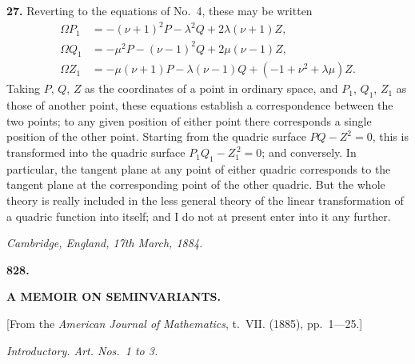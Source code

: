 \documentclass[12pt,a4paper]{article}
\theoremstyle{definition}
\begin{document}
\noindent\textbf{27.} Reverting to the equations of No.~4, these may be written
\begin{align*}
\Omega P_1 &= -(\nu+1)^2 P - \lambda^2 Q + 2\lambda(\nu+1)Z, \\
\Omega Q_1 &= -\mu^2 P - (\nu-1)^2 Q + 2\mu(\nu-1)Z, \\
\Omega Z_1 &= -\mu(\nu+1)P - \lambda(\nu-1)Q + (-1 + \nu^2 + \lambda\mu)Z.
\end{align*}
Taking $P$, $Q$, $Z$ as the coordinates of a point in ordinary space, and $P_1$, $Q_1$, $Z_1$ as those of another point, these equations establish a correspondence between the two points; to any given position of either point there corresponds a single position of the other point. Starting from the quadric surface $PQ - Z^2 = 0$, this is transformed into the quadric surface $P_1Q_1 - Z_1^{\,2} = 0$; and conversely. In particular, the tangent plane at any point of either quadric corresponds to the tangent plane at the corresponding point of the other quadric. But the whole theory is really included in the less general theory of the linear transformation of a quadric function into itself; and I do not at present enter into it any further.

\medskip
\begin{flushright}
\textit{Cambridge, England, 17th March, 1884.}
\end{flushright}

\vspace{1cm}


\newpage
\setcounter{page}{239}

\begin{center}
\Large\textbf{828.}

\bigskip

\Large\textbf{A MEMOIR ON SEMINVARIANTS.}
\end{center}

\begin{center}
[From the \textit{American Journal of Mathematics}, t.~VII. (1885), pp.~1---25.]
\end{center}

\begin{center}
\textit{Introductory. Art. Nos.~1 to 3.}
\end{center}
\end{document}
